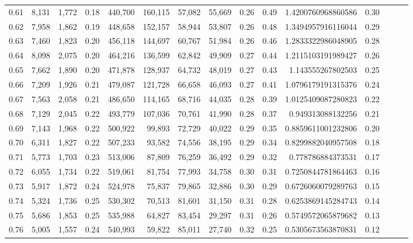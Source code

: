 \begin{tabular}{rrrrrrrrrrrrrrr}
0.61 &   8,131 &  1,772 &  0.18 &  440,700 &  160,115 &   57,082 &   55,669 &  0.26 &  0.49 &    1.4200760968860586 &      0.30 \\
0.62 &   7,958 &  1,862 &  0.19 &  448,658 &  152,157 &   58,944 &   53,807 &  0.26 &  0.48 &    1.3494957916116044 &      0.29 \\
0.63 &   7,460 &  1,823 &  0.20 &  456,118 &  144,697 &   60,767 &   51,984 &  0.26 &  0.46 &    1.2833322986048905 &      0.28 \\
0.64 &   8,098 &  2,075 &  0.20 &  464,216 &  136,599 &   62,842 &   49,909 &  0.27 &  0.44 &    1.2115103191989427 &      0.26 \\
0.65 &   7,662 &  1,890 &  0.20 &  471,878 &  128,937 &   64,732 &   48,019 &  0.27 &  0.43 &     1.143555267802503 &      0.25 \\
0.66 &   7,209 &  1,926 &  0.21 &  479,087 &  121,728 &   66,658 &   46,093 &  0.27 &  0.41 &    1.0796179191315376 &      0.24 \\
0.67 &   7,563 &  2,058 &  0.21 &  486,650 &  114,165 &   68,716 &   44,035 &  0.28 &  0.39 &    1.0125409087280823 &      0.22 \\
0.68 &   7,129 &  2,045 &  0.22 &  493,779 &  107,036 &   70,761 &   41,990 &  0.28 &  0.37 &     0.949313088132256 &      0.21 \\
0.69 &   7,143 &  1,968 &  0.22 &  500,922 &   99,893 &   72,729 &   40,022 &  0.29 &  0.35 &    0.8859611001232806 &      0.20 \\
0.70 &   6,311 &  1,827 &  0.22 &  507,233 &   93,582 &   74,556 &   38,195 &  0.29 &  0.34 &    0.8299882040957508 &      0.18 \\
0.71 &   5,773 &  1,703 &  0.23 &  513,006 &   87,809 &   76,259 &   36,492 &  0.29 &  0.32 &     0.778786884373531 &      0.17 \\
0.72 &   6,055 &  1,734 &  0.22 &  519,061 &   81,754 &   77,993 &   34,758 &  0.30 &  0.31 &    0.7250844781864463 &      0.16 \\
0.73 &   5,917 &  1,872 &  0.24 &  524,978 &   75,837 &   79,865 &   32,886 &  0.30 &  0.29 &    0.6726060079289763 &      0.15 \\
0.74 &   5,324 &  1,736 &  0.25 &  530,302 &   70,513 &   81,601 &   31,150 &  0.31 &  0.28 &    0.6253869145284743 &      0.14 \\
0.75 &   5,686 &  1,853 &  0.25 &  535,988 &   64,827 &   83,454 &   29,297 &  0.31 &  0.26 &    0.5749572065879682 &      0.13 \\
0.76 &   5,005 &  1,557 &  0.24 &  540,993 &   59,822 &   85,011 &   27,740 &  0.32 &  0.25 &    0.5305673563870831 &      0.12 \\

\end{tabular}
